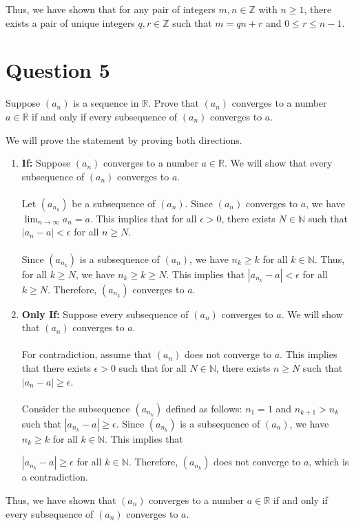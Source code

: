 \documentclass{article}
\begin{document}
\begin{proofbox}
\begin{enumerate}
    \end{enumerate}
    Thus, we have shown that for any pair of integers $m, n \in \mathbb{Z}$ with $n \geq 1$, there exists a pair of unique integers $q, r \in \mathbb{Z}$ such that $m = qn + r$ and $0 \leq r \leq n -1$.
\end{proofbox}


\section{Question 5}
Suppose $(a_n)$ is a sequence in $\mathbb{R}$. Prove that $(a_n)$ converges to a number $a \in \mathbb{R}$ if and only if every subsequence of $(a_n)$ converges to $a$.
\begin{proofbox}
    We will prove the statement by proving both directions.
    \begin{enumerate}
        \item \textbf{If:} Suppose $(a_n)$ converges to a number $a \in \mathbb{R}$. We will show that every subsequence of $(a_n)$ converges to $a$.
        \\ \\ 
        Let $(a_{n_k})$ be a subsequence of $(a_n)$. Since $(a_n)$ converges to $a$, we have $\lim_{n \to \infty} a_n = a$. This implies that for all $\epsilon > 0$, there exists $N \in \mathbb{N}$ such that $|a_n - a| < \epsilon$ for all $n \geq N$.
        \\ \\ 
        Since $(a_{n_k})$ is a subsequence of $(a_n)$, we have $n_k \geq k$ for all $k \in \mathbb{N}$. Thus, for all $k \geq N$, we have $n_k \geq k \geq N$. This implies that $|a_{n_k} - a| < \epsilon$ for all $k \geq N$. Therefore, $(a_{n_k})$ converges to $a$.
        \item \textbf{Only If:} Suppose every subsequence of $(a_n)$ converges to $a$. We will show that $(a_n)$ converges to $a$.
        \\ \\ 
        For contradiction, assume that $(a_n)$ does not converge to $a$. This implies that there exists $\epsilon > 0$ such that for all $N \in \mathbb{N}$, there exists $n \geq N$ such that $|a_n - a| \geq \epsilon$.
        \\ \\ 
        Consider the subsequence $(a_{n_k})$ defined as follows: $n_1 = 1$ and $n_{k + 1} > n_k$ such that $|a_{n_k} - a| \geq \epsilon$. Since $(a_{n_k})$ is a subsequence of $(a_n)$, we have $n_k \geq k$ for all $k \in \mathbb{N}$. This implies that
    
        $|a_{n_k} - a| \geq \epsilon$ for all $k \in \mathbb{N}$. Therefore, $(a_{n_k})$ does not converge to $a$, which is a contradiction.
    \end{enumerate}
    Thus, we have shown that $(a_n)$ converges to a number $a \in \mathbb{R}$ if and only if every subsequence of $(a_n)$ converges to $a$.
\end{proofbox}
\end{document}
